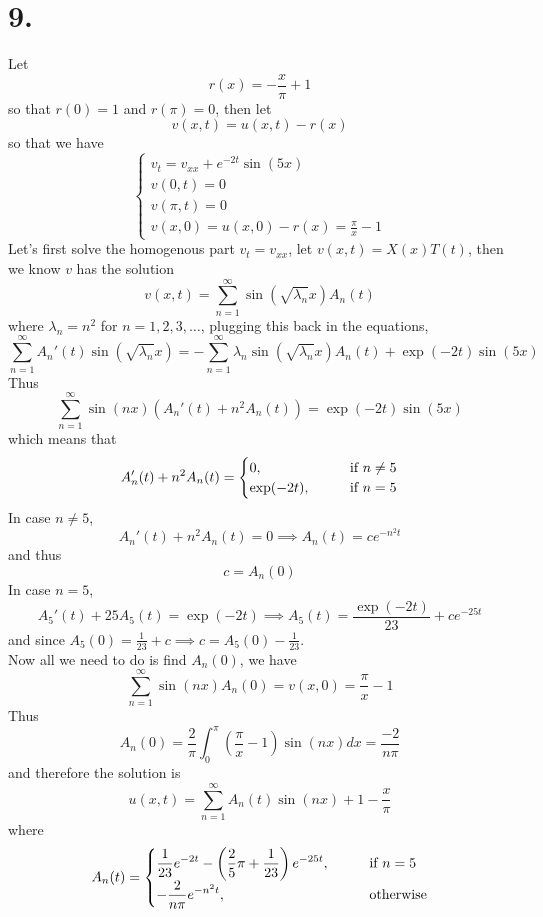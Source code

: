 \documentclass[11pt]{article}
\theoremstyle{mystyle}
\theoremstyle{definition}
\begin{document}
\section*{9.}
Let 
\[
  r(x) = - \displaystyle\frac{x}{\pi} + 1
\]
so that $r(0) = 1$ and $r(\pi) = 0$, then let 
\[
  v(x,t) = u(x,t) - r(x)
\]
so that we have 
\[
  \begin{cases}
    v_t = v_{xx} + e^{-2t} \sin(5x) \\
    v(0,t) = 0 \\
    v(\pi, t) = 0 \\
    v(x,0) = u(x,0) - r(x) = \displaystyle\frac{\pi}{x} - 1
  \end{cases}
\]
Let's first solve the homogenous part $v_t = v_{xx}$, let $v(x,t) = X(x)T(t)$, then we know $v$ has the solution 
\[
  v(x,t) = \sum_{n=1}^\infty  \sin(\sqrt{\lambda_n} x) A_n(t)
\]
where $\lambda_n = n^2$ for $n=1,2,3, \hdots$, plugging this back in the equations, 
\[
  \sum_{n=1}^\infty  A_n'(t) \sin(\sqrt{\lambda_n} x) = -\sum_{n=1}^\infty \lambda_n \sin(\sqrt{\lambda_n} x) A_n(t) + \exp(-2t) \sin(5x)
\]
Thus 
\[
  \sum_{n=1}^\infty \sin(n x) \left(A_n'(t) + n^2 A_n(t)\right) = \exp(-2t) \sin(5x)
\]
which means that 
\[
  A_n'(t) + n^2 A_n(t) = 
  \begin{cases}
    0, \indent& \text{ if } n\ne 5 \\
    \exp(-2t), \indent& \text{ if } n = 5
  \end{cases}
\]
In case $n \ne 5$, 
\[
  A_n'(t) + n^2 A_n(t) = 0 \implies A_n(t) = ce^{-n^2 t}
\]
and thus 
\[
  c = A_n(0)
\]
In case $n=5$, 
\[
  A_5'(t) + 25 A_5(t) = \exp(-2t) \implies A_5(t) = \displaystyle\frac{\exp(-2t)}{23} + ce^{-25t}
\]
and since $A_5(0) = \displaystyle\frac{1}{23} + c \implies c = A_5(0) - \displaystyle\frac{1}{23}$. \\
Now all we need to do is find $A_n(0)$, we have 
\[
  \sum_{n=1}^\infty \sin(nx) A_n(0) = v(x,0) = \displaystyle\frac{\pi}{x}-1
\]
Thus 
\[
  A_n(0) = \displaystyle\frac{2}{\pi} \int_0^\pi \left( \displaystyle\frac{\pi}{x}-1\right) \sin(nx) dx = \displaystyle\frac{-2}{n\pi}
\]
and therefore the solution is 
\[
  u(x,t) = \sum_{n=1}^\infty A_n(t)\sin(nx) + 1 - \displaystyle\frac{x}{\pi}
\]
where 
\[
  A_n(t) = 
  \begin{cases}
    \displaystyle\frac{1}{23}e^{-2t} - \left(\displaystyle\frac{2}{5}\pi + \displaystyle\frac{1}{23}\right)e^{-25t}, \indent &\text{ if } n = 5 \\
    -\displaystyle\frac{2}{n\pi}e^{-n^2t}, \indent &\text{ otherwise}
  \end{cases}
\]
\newpage
\end{document}
